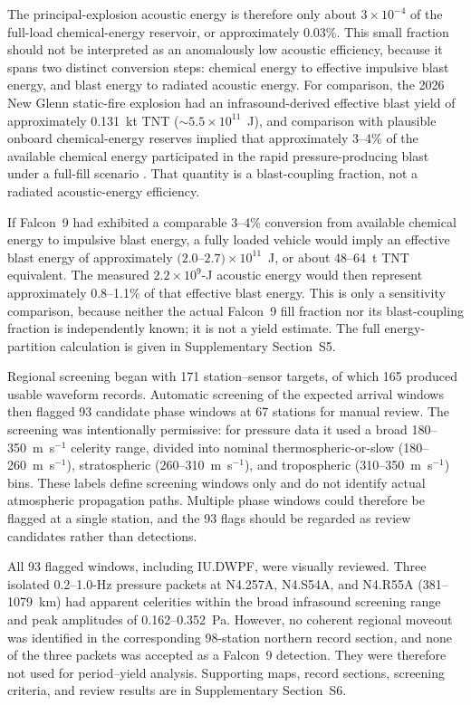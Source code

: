\documentclass[]{seismica}
\begin{document}
The principal-explosion acoustic energy is therefore only about
$3\times10^{-4}$ of the full-load chemical-energy reservoir, or approximately
0.03\%. This small fraction should not be interpreted as an anomalously low
acoustic efficiency, because it spans two distinct conversion steps:
chemical energy to effective impulsive blast energy, and blast energy to
radiated acoustic energy. For comparison, the 2026 New Glenn static-fire
explosion had an infrasound-derived effective blast yield of approximately
0.131~kt TNT ($\sim5.5\times10^{11}$~J), and comparison with plausible onboard
chemical-energy reserves implied that approximately 3--4\% of the available
chemical energy participated in the rapid pressure-producing blast under a
full-fill scenario \citep{silber_scamfer_newglenn_2026}. That quantity is a
blast-coupling fraction, not a radiated acoustic-energy efficiency.

If Falcon~9 had exhibited a comparable 3--4\% conversion from available
chemical energy to impulsive blast energy, a fully loaded vehicle would imply
an effective blast energy of approximately
$(2.0$--$2.7)\times10^{11}$~J, or about 48--64~t TNT equivalent. The measured
$2.2\times10^9$-J acoustic energy would then represent approximately
0.8--1.1\% of that effective blast energy. This is only a sensitivity
comparison, because neither the actual Falcon~9 fill fraction nor its
blast-coupling fraction is independently known; it is not a yield estimate.
The full energy-partition calculation is given in Supplementary
Section~S5.

Regional screening began with 171 station--sensor targets, of which 165
produced usable waveform records. Automatic screening of the expected arrival
windows then flagged 93 candidate phase windows at 67 stations for manual
review. The screening was intentionally permissive: for pressure data it used
a broad 180--350~m~s$^{-1}$ celerity range, divided into nominal
thermospheric-or-slow (180--260~m~s$^{-1}$), stratospheric
(260--310~m~s$^{-1}$), and tropospheric (310--350~m~s$^{-1}$) bins. These
labels define screening windows only and do not identify actual atmospheric
propagation paths. Multiple phase windows could therefore be flagged at a
single station, and the 93 flags should be regarded as review candidates
rather than detections.

All 93 flagged windows, including IU.DWPF, were visually reviewed. Three
isolated 0.2--1.0-Hz pressure packets at N4.257A, N4.S54A, and N4.R55A
(381--1079~km) had apparent celerities within the broad infrasound screening
range and peak amplitudes of 0.162--0.352~Pa. However, no coherent regional
moveout was identified in the corresponding 98-station northern record
section, and none of the three packets was accepted as a Falcon~9 detection.
They were therefore not used for period--yield analysis. Supporting maps,
record sections, screening criteria, and review results are in Supplementary
Section~S6.
\end{document}
